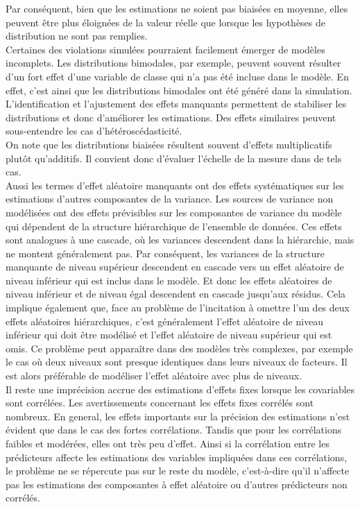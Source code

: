 \documentclass{article}
\begin{document}
Par conséquent, bien que les estimations ne soient pas biaisées en moyenne, elles peuvent être plus éloignées de la valeur réelle que lorsque les hypothèses de distribution ne sont pas remplies.\\ 
Certaines des violations simulées pourraient facilement émerger de modèles incomplets. Les distributions bimodales, par exemple, peuvent souvent résulter d'un fort effet d'une variable de classe qui n’a pas été incluse dans le modèle. En effet, c'est ainsi que les distributions bimodales ont été généré dans la simulation. L'identification et l'ajustement des effets manquants permettent de stabiliser les distributions et donc d'améliorer les estimations. Des effets similaires peuvent sous-entendre les cas d'hétéroscédasticité.\\

 On note que les distributions biaisées résultent souvent d'effets multiplicatifs plutôt qu'additifs. Il convient donc d'évaluer l'échelle de la mesure dans de tels cas.\\

Aussi  les termes d'effet aléatoire manquants ont des effets systématiques sur les estimations d'autres composantes de la variance. Les sources de variance non modélisées ont des effets prévisibles sur les composantes de variance du modèle qui dépendent de la structure hiérarchique de l'ensemble de données. Ces effets sont analogues à une cascade, où les variances descendent dans la hiérarchie, mais ne montent généralement pas. Par conséquent, les variances de la structure manquante de niveau supérieur descendent en cascade vers un effet aléatoire de niveau inférieur qui est inclus dans le modèle. Et donc les effets aléatoires de niveau inférieur et de niveau égal descendent en cascade jusqu'aux résidus. Cela implique également que, face au problème de l'incitation à omettre l'un des deux effets aléatoires hiérarchiques, c'est généralement l'effet aléatoire de niveau inférieur qui doit être modélisé et l'effet aléatoire de niveau supérieur qui est omis. Ce problème peut apparaître dans des modèles très complexes, par exemple le cas où deux niveaux sont presque identiques dans leurs niveaux de facteurs. Il est alors préférable de modéliser l'effet aléatoire avec plus de niveaux. \\

Il reste une imprécision accrue des estimations d'effets fixes lorsque les covariables sont corrélées. Les avertissements concernant les effets fixes corrélés sont nombreux. En general, les effets importants sur la précision des estimations n'est évident que dans le cas des fortes corrélations. Tandis que pour les corrélations faibles et modérées, elles ont très peu d'effet. Ainsi  si la corrélation entre les prédicteurs affecte les estimations des variables impliquées dans ces corrélations, le problème ne se répercute pas sur le reste du modèle, c'est-à-dire qu'il n'affecte pas les estimations des composantes à effet aléatoire ou d'autres prédicteurs non corrélés.\\
\end{document}
